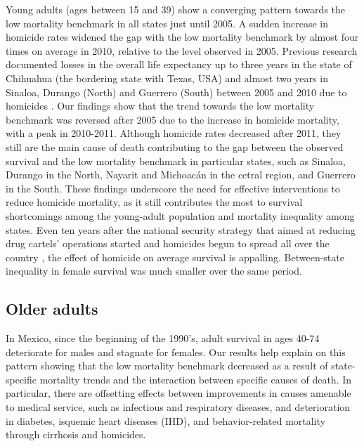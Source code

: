 \documentclass{bmcart}
\begin{document}
Young adults (ages between 15 and 39) show a converging pattern towards the low mortality benchmark in all states just until 2005. A sudden increase in homicide rates widened the gap with the low mortality benchmark by almost four times on average in 2010, relative to the level observed in 2005. Previous research documented losses in the overall life expectancy up to three years in the state of Chihuahua (the bordering state with Texas, USA) and almost two years in Sinaloa, Durango (North) and Guerrero (South) between 2005 and 2010 due to homicides \cite{Aburto2015}. Our findings show that the trend towards the low mortality benchmark was reversed after 2005 due to the increase in homicide mortality, with a peak in 2010-2011. Although homicide rates decreased after 2011, they still are the main cause of death contributing to the gap between the observed survival and the low mortality benchmark in particular states, such as Sinaloa, Durango in the North, Nayarit and Michoac\'an in the cetral region, and Guerrero in the South. These findings underscore the need for effective interventions to reduce homicide mortality, as it still contributes the most to survival shortcomings among the young-adult population and mortality inequality among states. Even ten years after the national security strategy that aimed at reducing drug cartels' operations started and homicides begun to spread all over the country \cite{espinal2015analysis}, the effect of homicide on average survival is appalling. Between-state inequality in female survival was much smaller over the same period.


\subsection*{Older adults}

In Mexico, since the beginning of the 1990's, adult survival in ages 40-74 deteriorate for males and stagnate for females. Our results help explain on this pattern showing that the low mortality benchmark decreased as a result of state-specific mortality trends and the interaction between specific causes of death. In particular, there are offsetting effects between improvements in causes amenable to medical service, such as infectious and respiratory diseases, and deterioration in diabetes, isquemic heart diseases (IHD), and behavior-related mortality through cirrhosis and homicides. 
\end{document}
